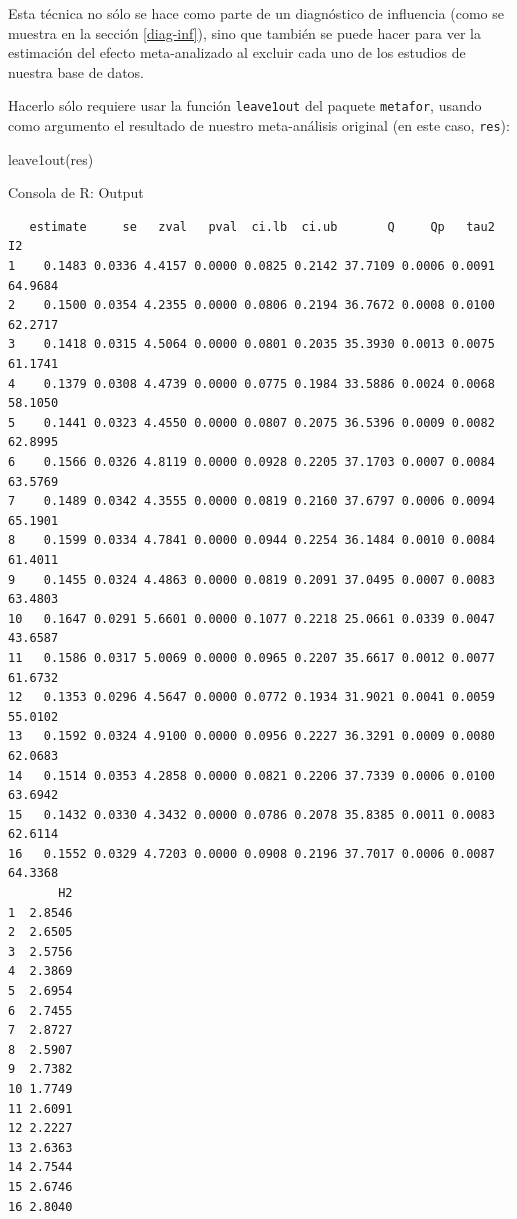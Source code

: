 \documentclass[
  bookmarksnumbered]{article}
\newenvironment{Shaded}{\begin{snugshade}}{\end{snugshade}}
\newcommand{\FunctionTok}[1]{\textcolor[rgb]{0.39,0.29,0.61}{#1}}
\newcommand{\NormalTok}[1]{\textcolor[rgb]{0.12,0.11,0.11}{#1}}
\begin{document}
Esta técnica no sólo se hace como parte de un diagnóstico de influencia (como se muestra en la sección \ref{diag-inf}), sino que también se puede hacer para ver la estimación del efecto meta-analizado al excluir cada uno de los estudios de nuestra base de datos.

Hacerlo sólo requiere usar la función \texttt{leave1out} del paquete \texttt{metafor}, usando como argumento el resultado de nuestro meta-análisis original (en este caso, \texttt{res}):

\begin{Shaded}
\begin{Highlighting}[]
\FunctionTok{leave1out}\NormalTok{(res)}
\end{Highlighting}
\end{Shaded}

\begin{ROut}{Consola de R: Output~\thetcbcounter}
                \begin{footnotesize}
                \begin{verbatim} 
   estimate     se   zval   pval  ci.lb  ci.ub       Q     Qp   tau2      I2 
1    0.1483 0.0336 4.4157 0.0000 0.0825 0.2142 37.7109 0.0006 0.0091 64.9684 
2    0.1500 0.0354 4.2355 0.0000 0.0806 0.2194 36.7672 0.0008 0.0100 62.2717 
3    0.1418 0.0315 4.5064 0.0000 0.0801 0.2035 35.3930 0.0013 0.0075 61.1741 
4    0.1379 0.0308 4.4739 0.0000 0.0775 0.1984 33.5886 0.0024 0.0068 58.1050 
5    0.1441 0.0323 4.4550 0.0000 0.0807 0.2075 36.5396 0.0009 0.0082 62.8995 
6    0.1566 0.0326 4.8119 0.0000 0.0928 0.2205 37.1703 0.0007 0.0084 63.5769 
7    0.1489 0.0342 4.3555 0.0000 0.0819 0.2160 37.6797 0.0006 0.0094 65.1901 
8    0.1599 0.0334 4.7841 0.0000 0.0944 0.2254 36.1484 0.0010 0.0084 61.4011 
9    0.1455 0.0324 4.4863 0.0000 0.0819 0.2091 37.0495 0.0007 0.0083 63.4803 
10   0.1647 0.0291 5.6601 0.0000 0.1077 0.2218 25.0661 0.0339 0.0047 43.6587 
11   0.1586 0.0317 5.0069 0.0000 0.0965 0.2207 35.6617 0.0012 0.0077 61.6732 
12   0.1353 0.0296 4.5647 0.0000 0.0772 0.1934 31.9021 0.0041 0.0059 55.0102 
13   0.1592 0.0324 4.9100 0.0000 0.0956 0.2227 36.3291 0.0009 0.0080 62.0683 
14   0.1514 0.0353 4.2858 0.0000 0.0821 0.2206 37.7339 0.0006 0.0100 63.6942 
15   0.1432 0.0330 4.3432 0.0000 0.0786 0.2078 35.8385 0.0011 0.0083 62.6114 
16   0.1552 0.0329 4.7203 0.0000 0.0908 0.2196 37.7017 0.0006 0.0087 64.3368 
       H2 
1  2.8546 
2  2.6505 
3  2.5756 
4  2.3869 
5  2.6954 
6  2.7455 
7  2.8727 
8  2.5907 
9  2.7382 
10 1.7749 
11 2.6091 
12 2.2227 
13 2.6363 
14 2.7544 
15 2.6746 
16 2.8040 
 \end{verbatim}
                \end{footnotesize}
                \end{ROut}
\end{document}
